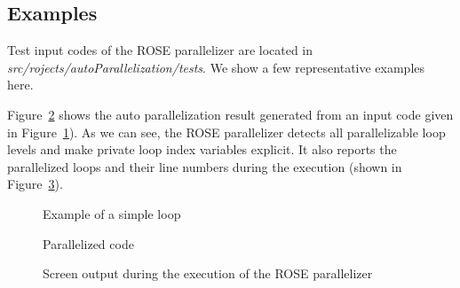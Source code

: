 \subsection{Examples}
Test input codes of the ROSE parallelizer are located in \textit{src/rojects/autoParallelization/tests}.
We show a few representative examples here. 

Figure~\ref{Manual:autopar:doall_2-trans} shows the auto parallelization result generated from  an input code given in
Figure~\ref{Manual:autopar:doall_2}).
As we can see, the ROSE parallelizer detects all parallelizable loop levels and make private loop index variables explicit.
It also reports the parallelized loops and their line numbers during the execution (shown in Figure~\ref{Manual:autopar:doall_2-output}).

\lstset{language=C,basicstyle=\scriptsize,numbers=left}
\begin{figure}[htbp]
{\indent
  {\mySmallFontSize
    \begin{latexonly}
    
    \end{latexonly}
    \begin{htmlonly}
    
    \end{htmlonly}
  }
}
\caption{Example of a simple loop}
\label{Manual:autopar:doall_2}
\end{figure}

\begin{figure}[htbp]
{\indent
  {\mySmallFontSize
    \begin{latexonly}
    
    \end{latexonly}
    \begin{htmlonly}
    
    \end{htmlonly}
  }
}
\caption{Parallelized code}
\label{Manual:autopar:doall_2-trans}
\end{figure}

\begin{figure}[htbp]
{\indent
  {\mySmallFontSize
    \begin{latexonly}
    
    \end{latexonly}
    \begin{htmlonly}
    
    \end{htmlonly}
  }
}
\caption{Screen output during the execution of the ROSE parallelizer}
\label{Manual:autopar:doall_2-output}
\end{figure}



